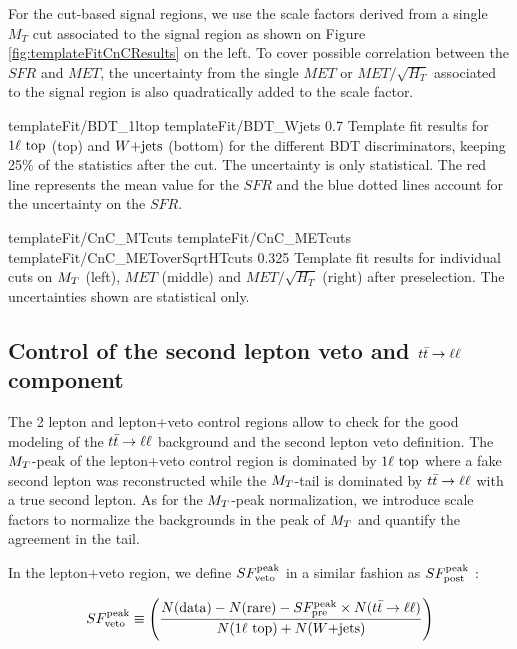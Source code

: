         For the cut-based signal regions, we use the scale factors derived from a single $M_T$ cut associated to the signal region as shown on Figure \ref{fig:templateFitCnCResults} on the left. To cover possible correlation between the $SFR$ and $MET$, the uncertainty from the single $MET$ or $MET/\sqrt{H_T}$ associated to the signal region is also quadratically added to the scale factor.

                          {templateFit/BDT_1ltop}
                          {templateFit/BDT_Wjets}
                          {0.7}
                          {Template fit results for $1\ell~\text{top}$ (top) and $\text{$W$+jets}$ (bottom) for the different BDT discriminators, keeping 25\% of the statistics after the cut. The uncertainty is only statistical. The red line represents the mean value for the $SFR$ and the blue dotted lines account for the uncertainty on the $SFR$.}

                           {templateFit/CnC_MTcuts}
                           {templateFit/CnC_METcuts}
                           {templateFit/CnC_METoverSqrtHTcuts}
                           {0.325}
                           {Template fit results for individual cuts on $M_T$ (left), $MET$ (middle) and $MET/\sqrt{H_T}$ (right) after preselection. The uncertainties shown are statistical only.}
        
        \subsection{Control of the second lepton veto and $t\bar{t} \rightarrow \ell \ell$ component}

        The 2 lepton and lepton+veto control regions allow to check for the good modeling of the $t\bar{t} \rightarrow \ell \ell$ background and the second lepton veto definition. The $M_T$-peak of the lepton+veto control region is dominated by $1\ell~\text{top}$ where a fake second lepton was reconstructed while the $M_T$-tail is dominated by $t\bar{t} \rightarrow \ell \ell$ with a true second lepton. As for the $M_T$-peak normalization, we introduce scale factors to normalize the backgrounds in the peak of $M_T$ and quantify the agreement in the tail. 

        In the lepton+veto region, we define $SF_{\text{veto}}^{\text{peak}}$ in a similar fashion as $SF_{\text{post}}^{\text{peak}}$ :

        \begin{equation}
            SF_{\text{veto}}^{\text{peak}} \equiv \left( \frac{N(\text{data}) - N(\text{rare}) - SF_{\text{pre}}^{\text{peak}} \times N(t\bar{t} \rightarrow \ell \ell)}{N(1\ell~\text{top}) + N(\text{$W$+jets})} \right)
        \end{equation}

